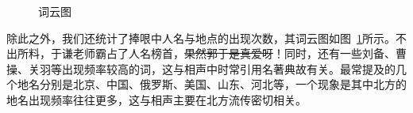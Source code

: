 \documentclass[12pt]{article} %
\begin{document}
\begin{sloppypar}
\begin{figure}[h]
	\centering
	\centering
	\caption{词云图}
	\label{fig:wc}
\end{figure}

除此之外，我们还统计了捧哏中人名与地点的出现次数，其词云图如图~\ref{fig:wc}所示。不出所料，于谦老师霸占了人名榜首，\sout{果然郭于是真爱呀}！同时，还有一些刘备、曹操、关羽等出现频率较高的词，这与相声中时常引用名著典故有关。最常提及的几个地名分别是北京、中国、俄罗斯、美国、山东、河北等，一个现象是其中北方的地名出现频率往往更多，这与相声主要在北方流传密切相关。


\end{sloppypar}
\end{document}
